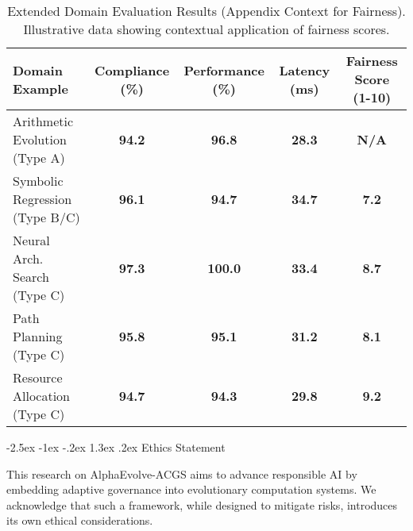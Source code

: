 \documentclass[manuscript,screen,9pt]{acmart}
\makeatletter
\renewcommand\section{\@startsection{section}{1}{\z@}%
  {-2.5ex \@plus -1ex \@minus -.2ex}%
  {1.3ex \@plus.2ex}%
  {\normalfont\Large\bfseries}}
\newcommand{\tablesize}{\footnotesize}
\newcommand{\tablenumfmt}[1]{\textbf{#1}}
\newcommand{\tableheader}[1]{\textbf{#1}}
\makeatother
\begin{document}
\begin{table}[!htb]
\begin{table}[htbp]
\centering
\caption{Extended Domain Evaluation Results (Appendix Context for Fairness). Illustrative data showing contextual application of fairness scores.}
\label{tab:appendix_extended_domain_results_fairness}
\tablesize
\begin{tabular}{@{}lcccc@{}}
\toprule
\tableheader{Domain Example} & \tableheader{Compliance (\%)} & \tableheader{Performance (\%)} & \tableheader{Latency (ms)} & \tableheader{Fairness Score (1-10)} \\
\midrule
Arithmetic Evolution (Type A) & \tablenumfmt{94.2} & \tablenumfmt{96.8} & \tablenumfmt{28.3} & \tablenumfmt{N/A} \\
Symbolic Regression (Type B/C) & \tablenumfmt{96.1} & \tablenumfmt{94.7} & \tablenumfmt{34.7} & \tablenumfmt{7.2} \\
Neural Arch. Search (Type C) & \tablenumfmt{97.3} & \tablenumfmt{100.0} & \tablenumfmt{33.4} & \tablenumfmt{8.7} \\
Path Planning (Type C) & \tablenumfmt{95.8} & \tablenumfmt{95.1} & \tablenumfmt{31.2} & \tablenumfmt{8.1} \\
Resource Allocation (Type C) & \tablenumfmt{94.7} & \tablenumfmt{94.3} & \tablenumfmt{29.8} & \tablenumfmt{9.2} \\
\bottomrule
\end{tabular}
\end{table}

\section{Ethics Statement}
\label{sec:ethics}

This research on AlphaEvolve-ACGS aims to advance responsible AI by embedding adaptive governance into evolutionary computation systems. We acknowledge that such a framework, while designed to mitigate risks, introduces its own ethical considerations.


\end{table}
\end{document}
